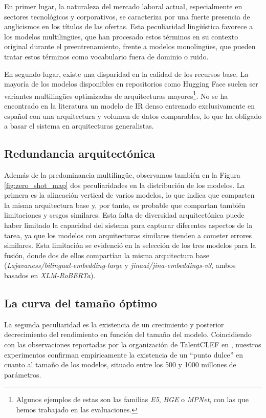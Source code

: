 En primer lugar, la naturaleza del mercado laboral actual, especialmente en sectores tecnológicos y corporativos, se caracteriza por una fuerte presencia de anglicismos en los títulos de las ofertas. Esta peculiaridad lingüística favorece a los modelos multilingües, que han procesado estos términos en su contexto original durante el preentrenamiento, frente a modelos monolingües, que pueden tratar estos términos como vocabulario fuera de dominio o ruido.

En segundo lugar, existe una disparidad en la calidad de los recursos base. La mayoría de los modelos disponibles en repositorios como Hugging Face suelen ser variantes multilingües optimizadas de arquitecturas mayores\footnote{Algunos ejemplos de estas son las familias \textit{E5}, \textit{BGE} o \textit{MPNet}, con las que hemos trabajado en las evaluaciones.}. No se ha encontrado en la literatura un modelo de \gls{IR} denso entrenado exclusivamente en español con una arquitectura y volumen de datos comparables, lo que ha obligado a basar el sistema en arquitecturas generalistas.


\subsection{Redundancia arquitectónica}
\noindent Además de la predominancia multilingüe, observamos también en la Figura \ref{fig:zero_shot_map} dos peculiaridades en la distribución de los modelos. La primera es la alineación vertical de varios modelos, lo que indica que comparten la misma arquitectura base y, por tanto, es probable que compartan también limitaciones y sesgos similares. Esta falta de diversidad arquitectónica puede haber limitado la capacidad del sistema para capturar diferentes aspectos de la tarea, ya que los modelos con arquitecturas similares tienden a cometer errores similares. Esta limitación se evidenció en la selección de los tres modelos para la fusión, donde dos de ellos compartían la misma arquitectura base (\textit{Lajavaness/bilingual-embedding-large} y \textit{jinaai/jina-embeddings-v3}, ambos basados en \textit{XLM-RoBERTa}).

\subsection{La curva del tamaño óptimo}
\noindent La segunda peculiaridad es la existencia de un crecimiento y posterior decrecimiento del rendimiento en función del tamaño del modelo. Coincidiendo con las observaciones reportadas por la organización de TalentCLEF en \cite{gasco2025overview}, nuestros experimentos confirman empíricamente la existencia de un ``punto dulce'' en cuanto al tamaño de los modelos, situado entre los 500 y 1000 millones de parámetros. 

